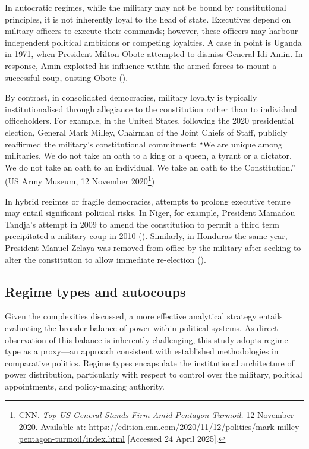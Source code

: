 \documentclass[
  12pt,
]{report}
\begin{document}
In autocratic regimes, while the military may not be bound by
constitutional principles, it is not inherently loyal to the head of
state. Executives depend on military officers to execute their commands;
however, these officers may harbour independent political ambitions or
competing loyalties. A case in point is Uganda in 1971, when President
Milton Obote attempted to dismiss General Idi Amin. In response, Amin
exploited his influence within the armed forces to mount a successful
coup, ousting Obote ().

By contrast, in consolidated democracies, military loyalty is typically
institutionalised through allegiance to the constitution rather than to
individual officeholders. For example, in the United States, following
the 2020 presidential election, General Mark Milley, Chairman of the
Joint Chiefs of Staff, publicly reaffirmed the military's constitutional
commitment: ``We are unique among militaries. We do not take an oath to
a king or a queen, a tyrant or a dictator. We do not take an oath to an
individual. We take an oath to the Constitution.'' (US Army Museum, 12
November 2020\footnote{CNN. \emph{Top US General Stands Firm Amid
  Pentagon Turmoil.} 12 November 2020. Available at:
  \url{https://edition.cnn.com/2020/11/12/politics/mark-milley-pentagon-turmoil/index.html}
  {[}Accessed 24 April 2025{]}.})

In hybrid regimes or fragile democracies, attempts to prolong executive
tenure may entail significant political risks. In Niger, for example,
President Mamadou Tandja's attempt in 2009 to amend the constitution to
permit a third term precipitated a military coup in 2010
(). Similarly, in Honduras
the same year, President Manuel Zelaya was removed from office by the
military after seeking to alter the constitution to allow immediate
re-election ().

\subsection*{Regime types and
autocoups}\label{regime-types-and-autocoups}

Given the complexities discussed, a more effective analytical strategy
entails evaluating the broader balance of power within political
systems. As direct observation of this balance is inherently
challenging, this study adopts regime type as a proxy---an approach
consistent with established methodologies in comparative politics.
Regime types encapsulate the institutional architecture of power
distribution, particularly with respect to control over the military,
political appointments, and policy-making authority.
\end{document}
